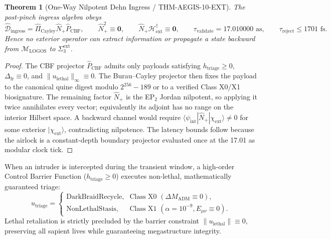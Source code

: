 \documentclass[11pt,onecolumn]{article}
\newtheorem{theorem}{Theorem}
\begin{document}
\begin{theorem}[One-Way Nilpotent Dehn Ingress / THM-AEGIS-10-EXT]
The post-pinch ingress algebra obeys
\begin{equation}
\hat{\mathcal D}_{\text{ingress}}=\hat{\Pi}_{\text{Cayley}}\hat N_+\hat P_{\text{CBF}},
\qquad
\hat N_+^2\equiv\mathbf 0,
\qquad
\hat N_+\mathcal H_{\text{ext}}^{\dagger}\equiv\mathbf 0,
\qquad
\tau_{\text{validate}}=17.010000\text{ as},
\qquad
\tau_{\text{reject}}\le1701\text{ fs}.
\label{eq:thm_aegis10_airlock}
\end{equation}
Hence no exterior operator can extract information or propagate a state backward from $\mathcal M_{\text{LOGOS}}$ to $\Sigma_3^{\text{ext}}$.
\end{theorem}

\begin{proof}
The CBF projector $\hat P_{\text{CBF}}$ admits only payloads satisfying $h_{\text{triage}}\ge0$, $\Delta_{\text{fr}}\equiv0$, and $\|u_{\text{lethal}}\|_\infty\equiv0$. The Burau--Cayley projector then fixes the payload to the canonical quine digest modulo $2^{256}-189$ or to a verified Class X0/X1 biosignature. The remaining factor $\hat N_+$ is the EP$_2$ Jordan nilpotent, so applying it twice annihilates every vector; equivalently its adjoint has no range on the interior Hilbert space. A backward channel would require $\langle\psi_{\text{int}}|\hat N_+|\chi_{\text{ext}}\rangle\neq0$ for some exterior $|\chi_{\text{ext}}\rangle$, contradicting nilpotence. The latency bounds follow because the airlock is a constant-depth boundary projector evaluated once at the 17.01 as modular clock tick.
\end{proof}

When an intruder is intercepted during the transient window, a high-order Control Barrier Function ($h_{\text{triage}} \ge 0$) executes non-lethal, mathematically guaranteed triage:
\begin{equation}
u_{\text{triage}} = \begin{cases}
\text{DarkBraidRecycle}, & \text{Class X0 } (\Delta M_{\text{ADM}} \equiv 0), \\
\text{NonLethalStasis}, & \text{Class X1 } (\alpha = 10^{-9}, E_{\mu\nu} \equiv 0).
\end{cases}
\label{eq:cbf_triage_action}
\end{equation}
Lethal retaliation is strictly precluded by the barrier constraint $\|u_{\text{lethal}}\| \equiv 0$, preserving all sapient lives while guaranteeing megastructure integrity.
\end{document}
